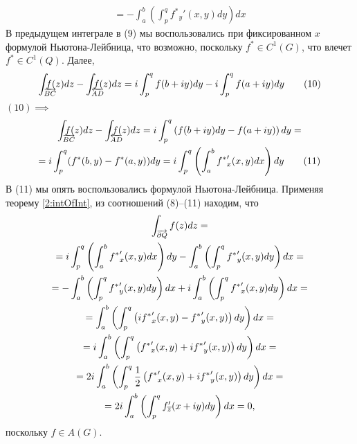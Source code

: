 \documentclass[main]{subfiles}
\begin{document}
\begin{longProof}
\begin{multline*}
        = - \int_{a}^{b} \left( \int_{p}^{q} {f^*}_y' (x, y) dy\right) dx \tag{9}
    \end{multline*}
    В предыдущем интеграле в (9) мы воспользовались при фиксированном $x$ формулой Ньютона-Лейбница, что возможно, поскольку $f^* \in C^1(G)$, что влечет $f^* \in C^1(Q)$.
    Далее,
    \[\AnClOrInt[\mathrlap{\AnClOrCurve[BC]}] f(z) dz - \ClOrInt[\mathrlap{\ClOrCurve[AD]}] f(z) dz = i \int_{p}^{q} f(b + iy) dy - i \int_{p}^{q} f(a + iy) dy \tag{10}\]
    $(10) \implies$
    \begin{multline*}
        \AnClOrInt[\mathrlap{\AnClOrCurve[BC]}] f(z) dz - \ClOrInt[\mathrlap{\ClOrCurve[AD]}] f(z) dz = i \int_{p}^{q} \left( f(b + iy) dy - f(a + iy) \right) dy = \\
        = i \int_{p}^{q} (f^*(b, y) - f^*(a, y)) dy = i \int_{p}^{q} \left( \int_{a}^{b} {f^*}_x' (x, y) dx\right) dy \tag{11}
    \end{multline*}
    В (11) мы опять воспользовались формулой Ньютона-Лейбница.
    Применяя теорему \ref{2:intOfInt}, из соотношений (8)--(11) находим, что
    \begin{multline*}
        \AnClOrInt[\AnClOrCurve[\partial Q]] f(z) dz = \\
        = i \int_{p}^{q} \left( \int_{a}^{b} {f^*}_x' (x, y) dx\right) dy - \int_{a}^{b} \left( \int_{p}^{q} {f^*}_y' (x, y) dy\right) dx = \\
        = - \int_{a}^{b} \left( \int_{p}^{q} {f^*}_y' (x, y) dy\right) dx + i \int_{a}^{b} \left( \int_{p}^{q} {f^*}_x' (x, y) dy\right) dx = \\
        = \int_{a}^{b} \left( \int_{p}^{q} \left( i {f^*}_x' (x, y) - {f^*}_y'(x, y)\right) dy \right) dx = \\
        = i \int_{a}^{b} \left( \int_{p}^{q} \left( {f^*}_x' (x, y) + i {f^*}_y'(x, y)\right) dy \right) dx = \\
        = 2 i \int_{a}^{b} \left( \int_{p}^{q} \frac{1}{2} \left( {f^*}_x' (x, y) + i {f^*}_y'(x, y)\right) dy \right) dx = \\
        = 2 i \int_{a}^{b} \left( \int_{p}^{q} f_{\overline{z}}' (x + iy) dy\right) dx = 0,
    \end{multline*}
    поскольку $f \in A(G)$.
\end{longProof}
\end{document}
